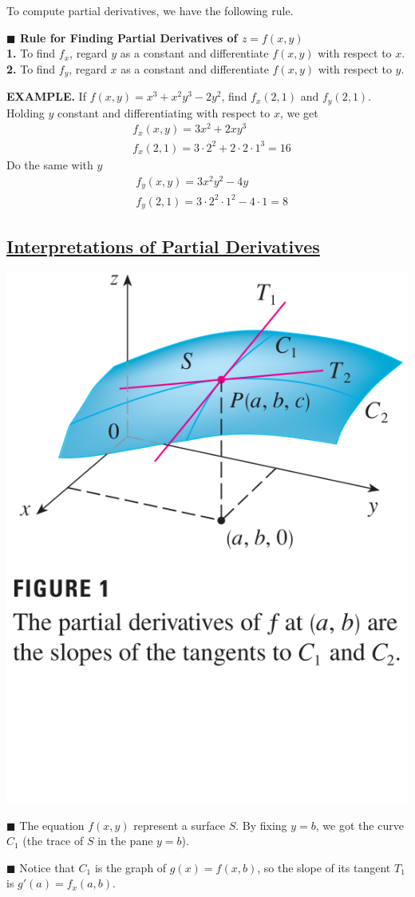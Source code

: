 \documentclass{article}
\begin{document}
To compute partial derivatives, we have the following rule.
\begin{mdframed}
  {\selectfont \textbf{\textcolor{blue5}{\small $\blacksquare$ Rule for Finding Partial Derivatives of $z = f(x,y)$}}} \\
{\selectfont \textbf{\small 1.}} To find $f_x$, regard $y$ as a constant and differentiate $f(x,y)$ with respect to $x$.\\
{\selectfont \textbf{\small 2.}} To find $f_y$, regard $x$ as a constant and differentiate $f(x,y)$ with respect to $y$.
\end{mdframed}
{\selectfont \textbf{\textcolor{blue5}{{\small {}} EXAMPLE.}}} If $f(x,y) = x^3 + x^2 y^3 - 2y^2$, find $f_x(2,1)$ and $f_y(2,1)$.
Holding $y$ constant and differentiating with respect to $x$, we get 
\begin{equation*}
  \begin{split}
 &   f_x(x,y) = 3 x^2 + 2x y^3 \\
 &  f_x(2,1) = 3 \cdot 2^2 + 2 \cdot 2 \cdot 1^3 = 16
  \end{split}
\end{equation*}
Do the same with $y$
\begin{equation*}
  \begin{split}
    & f_y (x,y) = 3 x^2 y^2 - 4y \\
    & f_y (2,1) = 3 \cdot 2^2 \cdot 1^2 - 4 \cdot 1 = 8       
  \end{split}
\end{equation*}

\subsection*{{\selectfont \underline{Interpretations of Partial Derivatives}}}

\begin{minipage}[]{0.34\linewidth}
  \begin{center}
    \includegraphics[width = 4.3 cm]{./images/interpretation.png} 
  \end{center}
\end{minipage}
\begin{minipage}[]{0.6\linewidth}
\textcolor{blue5}{\small $\blacksquare$}  The equation $f(x,y)$ represent a surface $S$. By fixing $y = b$, we got the curve $C_1$ (the trace of $S$ in the pane $y = b $).

\textcolor{blue5}{\small $\blacksquare$}  Notice that $C_1 $ is the graph of $g(x) = f(x, b )$, so the slope of its tangent $T_1$ is $g'(a) = f_x(a,b)$.
\end{minipage}
\end{document}

